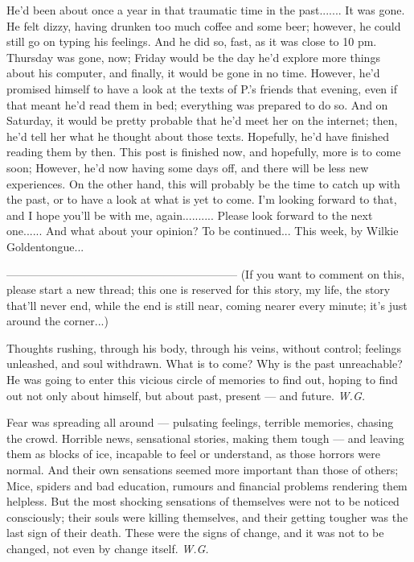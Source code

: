 He'd been about once a year in that traumatic time in the past.......
It was gone. He felt dizzy, having drunken too much coffee and some beer; however, he could still go on typing his feelings. And he did so, fast, as it was close to 10 pm. 
Thursday was gone, now; Friday would be the day he'd explore more things about his computer, and finally, it would be gone in no time. However, he'd promised himself to have a look at the texts of P.'s friends that evening, even if that meant he'd read them in bed; everything was prepared to do so. 
And on Saturday, it would be pretty probable that he'd meet her on the internet; then, he'd tell her what he thought about those texts. 
Hopefully, he'd have finished reading them by then. 
This post is finished now, and hopefully, more is to come soon; However, he'd now having some days off, and there will be less new experiences. On the other hand, this will probably be the time to catch up with the past, or to have a look at what is yet to come. 
I'm looking forward to that, and I hope you'll be with me, again..........
Please look forward to the next one......
And what about your opinion?
To be continued...
This week, by Wilkie Goldentongue...

--------------------------------------------------------------
(If you want to comment on this, please start a new thread; this one is reserved for this story, my life, the story that'll never end, while the end is still near, coming nearer every minute; it's just around the corner...)

Thoughts rushing, 
through his body, 
through his veins, 
without control; 
feelings unleashed, 
and soul withdrawn. 
What is to come? 
Why is the past unreachable? 
He was going to enter this vicious circle 
of memories 
to find out, 
hoping to find out not only about himself, 
but about past, present --- 
and future. 
\emph{W.G.}

Fear was spreading all around --- 
pulsating feelings, 
terrible memories, 
chasing the crowd. 
Horrible news, 
sensational stories, 
making them tough --- 
and leaving them as blocks of ice, 
incapable to feel or understand, 
as those horrors were normal. 
And their own sensations 
seemed more important than those 
of others; 
Mice, spiders and bad education, 
rumours and financial problems 
rendering them helpless. 
But the most shocking sensations 
of themselves 
were not to be noticed 
consciously; 
their souls were killing themselves, 
and their getting tougher 
was the last sign 
of their death. 
These were the signs of change, 
and it was not to be changed, 
not even by change itself. 
\emph{W.G.}
